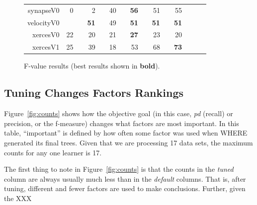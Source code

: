 \documentclass{sig-alternative}
\newcommand{\rone}{}
\newcommand{\rtwo}{}
\newcommand{\rthree}{}
\newcommand{\rfour}{}
\newcommand{\fig}[1]{Figure~\ref{fig:#1}}
\def\baselinestretch{1}
\begin{document}
\begin{center}
\begin{figure}[!h]
\begin{tabular}{r|rl|rl|rl|rl|rl|rlrl}
synapseV0 & 0 &         & 2 &         & 40 & {\rthree} & {\bf 56} & {\rfour} & 51 & {\rfour} & 55 & {\rfour}\\
velocityV0 & {\bf 51 & {\rfour} & {\bf 51} & {\rfour} & 49 &         & {\bf 51} & {\rfour} & {\bf 51} & {\rfour} & {\bf 51} & {\rfour}\\
xercesV0 & 22 & {\rone} & 20 &         & 21 &         & {\bf 27} & {\rfour} & 23 & {\rtwo} & 20 &        \\
xercesV1 & 25 &         & 39 & {\rone} & 18 &         & 53 & {\rthree} & 68 & {\rfour} & {\bf 73} & {\rfour}\\
\end{tabular}
\caption{F-value results (best results  shown in {\bf bold}).}
\label{fig:fbars}
\end{figure}


\subsection{Tuning Changes Factors Rankings }\label{sect:rank}

\fig{counts} shows how the objective goal (in this case,
{\em pd} (recall) or precision, or the f-measure) changes what factors are most important.
In this table, ``important'' is defined by how often some factor was used when WHERE generated
its final trees. Given that we are processing 17 data sets, the maximum counts for any 
one learner is 17. 

The first thing to note in \fig{counts} is that the counts in the {\em tuned} column are always usually
much less than in the {\em default} columns. That is, after tuning, different and fewer factors
are used to make conclusions. Further, given the XXX
\begin{figure}[!h]

\renewcommand{\baselinestretch}{0.8}
\scriptsize
\centering
  \begin{tabular}{c|c c|c c|c c|c c| c c }
  

\end{tabular}
\end{figure}
\end{center}
\end{document}

